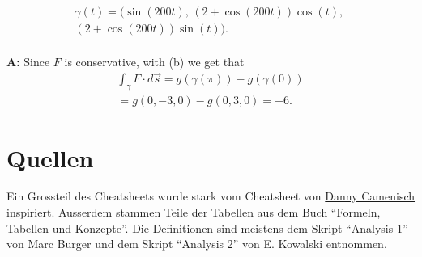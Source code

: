 \documentclass[a4paper,10pt]{article}
\begin{document}
\begin{enumerate}
\begin{enumerate}
\begin{multline*}
            \gamma(t) = (\sin(200t),\, (2 + \cos(200t)) \cos(t),\,\\
            (2 + \cos(200t)) \sin(t)) \text{.}
        \end{multline*}\\
        \textbf{A:} Since $F$ is conservative, with (b) we get that
        \begin{multline*}
            \int_\gamma F \cdot d \Vec{s} = g(\gamma(\pi)) - g(\gamma(0))\\
            = g(0, -3, 0) - g(0, 3, 0) = -6 \text{.}
        \end{multline*}
    \end{enumerate}
\end{enumerate}
\section{Quellen}
Ein Grossteil des Cheatsheets wurde stark vom Cheatsheet von \href{https://github.com/dannycamenisch}{Danny Camenisch} inspiriert. Ausserdem stammen Teile der Tabellen aus dem Buch ``Formeln, Tabellen und Konzepte''. Die Definitionen sind meistens dem Skript ``Analysis 1'' von Marc Burger und dem Skript ``Analysis 2'' von E. Kowalski entnommen.
\end{document}
